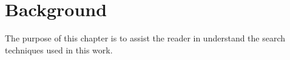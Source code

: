 \chapter{Background}

The purpose of this chapter is to assist the reader in understand the search techniques used in this work.






